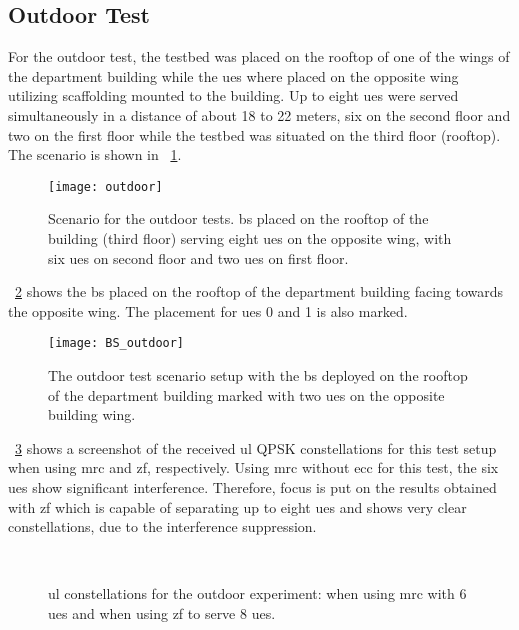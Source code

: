 \documentclass[journal]{IEEEtran}
\begin{document}
\subsection{Outdoor Test}
For the outdoor test, the testbed was placed on the rooftop of one of the wings of the department building while the \glspl{ue} where placed on the opposite wing utilizing scaffolding mounted to the building.
Up to eight \glspl{ue} were served simultaneously in a distance of about 18 to 22 meters, six on the second floor and two on the first floor while the testbed was situated on the third floor (rooftop).
The scenario is shown in \figurename~\ref{fig:outdoor_scenario}.

\begin{figure}[!t]
	\centering
	\texttt{[image: outdoor]}
	\caption{Scenario for the outdoor tests. \gls{bs} placed on the rooftop of the building (third floor) serving eight \glspl{ue} on the opposite wing, with six \glspl{ue} on second floor and two \glspl{ue} on first floor.}
	\label{fig:outdoor_scenario}
\end{figure} 
\figurename~\ref{fig:Outdoor_figures} shows the \gls{bs} placed on the rooftop of the department building facing towards the opposite wing. The placement for \glspl{ue} 0 and 1 is also marked.
%
%
%
%
%
%
%
%
%
\begin{figure}[!t]
	\centering
	\texttt{[image: BS\_outdoor]}
	\caption{The outdoor test scenario setup with the \gls{bs} deployed on the rooftop of the department building marked with two \glspl{ue} on the opposite building wing.}
	\label{fig:Outdoor_figures}
\end{figure} 
%

\figurename~\ref{fig:UL_const_MRC_ZF} shows a screenshot of the received \gls{ul} QPSK constellations for this test setup when using \gls{mrc} and \gls{zf}, respectively.
Using \gls{mrc} without \gls{ecc} for this test, the six \glspl{ue} show significant interference.
Therefore, focus is put on the results obtained with \gls{zf} which is capable of separating up to eight \glspl{ue} and shows very clear constellations, due to the interference suppression.
%
\begin{figure}[!t]
	\centering
	\\
	\caption{\gls{ul} constellations for the outdoor experiment: \protect{} when using \gls{mrc} with 6 \glspl{ue} and \protect{} when using \gls{zf} to serve 8 \glspl{ue}.}
	\label{fig:UL_const_MRC_ZF}
\end{figure} 
\end{document}
